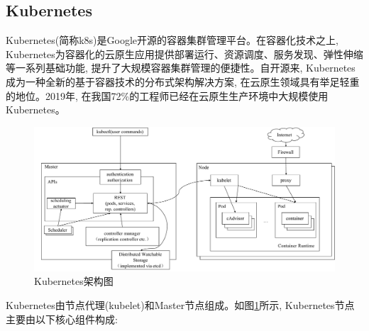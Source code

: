 \subsection{Kubernetes}

Kubernetes(简称k8s)是Google开源的容器集群管理平台。在容器化技术之上, Kubernetes为容器化的云原生应用提供部署运行、资源调度、服务发现、弹性伸缩等一系列基础功能, 提升了大规模容器集群管理的便捷性。自开源来, Kubernetes成为一种全新的基于容器技术的分布式架构解决方案, 在云原生领域具有举足轻重的地位。2019年, 在我国72\%的工程师已经在云原生生产环境中大规模使用Kubernetes\footnotemark[1]。

\begin{figure}[h] %
    \centering %
    \includegraphics[width=1.0\textwidth]{FIGs/chapter2/k8s.pdf} %
    \caption{Kubernetes架构图} %
    \label{k8s} %
\end{figure}%

Kubernetes由节点代理(kubelet)和Master节点组成。如图\ref{k8s}所示, Kubernetes节点主要由以下核心组件构成:

